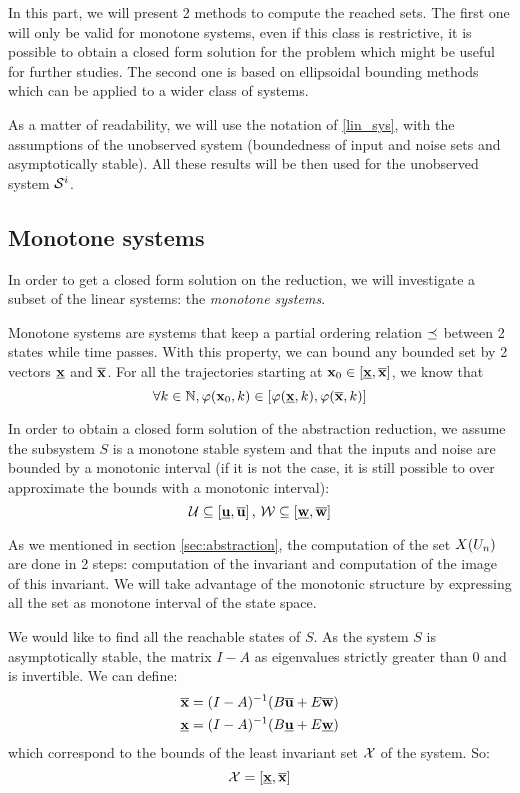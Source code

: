 In this part, we will present 2 methods to compute the reached sets.
The first one will only be valid for monotone systems, even if this class is restrictive, it is possible to obtain a closed form solution for the problem which might be useful for further studies.
The second one is based on ellipsoidal bounding methods which can be applied to a wider class of systems. 

As a matter of readability, we will use the notation of \ref{lin_sys}, with the assumptions of the unobserved system (boundedness of input and noise sets and asymptotically stable).
All these results will be then used for the unobserved system $\mathcal{S}^i$.

\subsection{Monotone systems}
In order to get a closed form solution on the reduction, we will investigate a subset of the linear systems: the \textit{monotone systems}.

Monotone systems are systems that keep a partial ordering relation $\preceq$ between 2 states while time passes.
With this property, we can bound any bounded set by 2 vectors $\underline{ \mathbf{x}}$ and $\overline{ \mathbf{x}}$.
For all the trajectories starting at $ \mathbf{x}_0 \in [\underline{ \mathbf{x}},\overline{ \mathbf{x}}]$, we know that
\begin{equation}
\forall k \in \mathbb{N}, \varphi( \mathbf{x}_0,k) \in [\varphi(\underline{ \mathbf{x}},k),\varphi(\overline{ \mathbf{x}},k)]
\end{equation}

In order to obtain a closed form solution of the abstraction reduction, we assume the subsystem $S$ is a monotone stable system and that the inputs and noise are bounded by a monotonic interval (if it is not the case, it is still possible to over approximate the bounds with a monotonic interval):
\begin{equation*}
\mathcal{U} \subseteq \left [ \underline{ \mathbf{u}}, \overline{ \mathbf{u}} \right ]
\textrm{, }
\mathcal{W} \subseteq \left [ \underline{ \mathbf{w}}, \overline{ \mathbf{w}} \right ]
\end{equation*}

As we mentioned in section \ref{sec:abstraction}, the computation of the set $X(U_n)$ are done in 2 steps: computation of the invariant and computation of the image of this invariant.
We will take advantage of the monotonic structure by expressing all the set as monotone interval of the state space.

We would like to find all the reachable states of $S$.
As the system $S$ is asymptotically stable, the matrix $I-A$ as eigenvalues strictly greater than $0$ and is invertible.
We can define:
\begin{equation}
\begin{split}
\overline{ \mathbf{x}} &= (I-A)^{-1} (B \overline{ \mathbf{u}} + E \overline{ \mathbf{w}})\\
\underline{ \mathbf{x}} &= (I-A)^{-1} (B \underline{ \mathbf{u}} + E \underline{ \mathbf{w}})\\
\end{split}
\end{equation}
which correspond to the bounds of the least invariant set $\mathcal{X}$ of the system.
So:
\begin{equation}
\mathcal{X} = \left[ \underline{ \mathbf{x}}, \overline{ \mathbf{x}} \right]
\end{equation}

